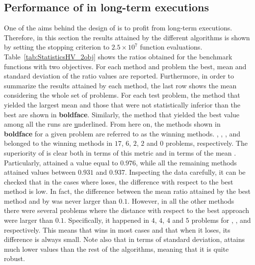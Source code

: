 \subsection{Performance of \MOEAS{} in long-term executions}

One of the aims behind the design of \AVSDMOEAD{} is to profit from long-term executions.
%
Therefore, in this section the results attained by the different algorithms is shown by setting 
the stopping criterion to $2.5 \times 10^7$ function evaluations.
%
Table~\ref{tab:StatisticsHV_2obj} shows the \HV{} ratios obtained for the benchmark functions with two objectives.
%
For each method and problem the best, mean and standard deviation of the \HV{} ratio values are reported.
%
Furthermore, in order to summarize the results attained by each method, the last row shows the mean considering the whole set 
of problems.
%
For each test problem, the method that yielded the largest mean and those that were not statistically inferior than the 
best are shown in \textbf{boldface}.
%
Similarly, the method that yielded the best \HV{} value among all the runs are {\ul underlined}.
%
From here on, the methods shown in {\bf boldface} for a given problem are referred to as the winning methods.
%
\AVSDMOEAD{}, \RMOEA{}, \MOEADDE{}, \NSGAIII{} and \NSGAII{} belonged to the winning methods in 
$17$, $6$, $2$, $2$ and $0$ problems, respectively.
%
The superiority of \AVSDMOEAD{} is clear both in terms of this metric and in terms of the mean \HV{}.
%
Particularly, \AVSDMOEAD{} attained a value equal to $0.976$, while all the remaining methods attained values between
$0.931$ and $0.937$.
%
Inspecting the data carefully, it can be checked that in the cases where \AVSDMOEAD{} loses, the difference with respect to the best 
method is low.
%
In fact, the difference between the mean \HV{} ratio attained by the best method and by \AVSDMOEAD{} was never larger than $0.1$.
%
However, in all the other methods there were several problems where the distance with respect to the best approach
were larger than $0.1$.
%
Specifically, it happened in $4$, $4$, $4$ and $5$ problems for \RMOEA{}, \MOEADDE{}, \NSGAII{} and \NSGAIII{} respectively.
%
This means that \AVSDMOEAD{} wins in most cases and that when it loses, its difference is always small.
%
Note also that in terms of standard deviation, \AVSDMOEAD{} attains much lower values than the rest of the algorithms, meaning that
it is quite robust.


